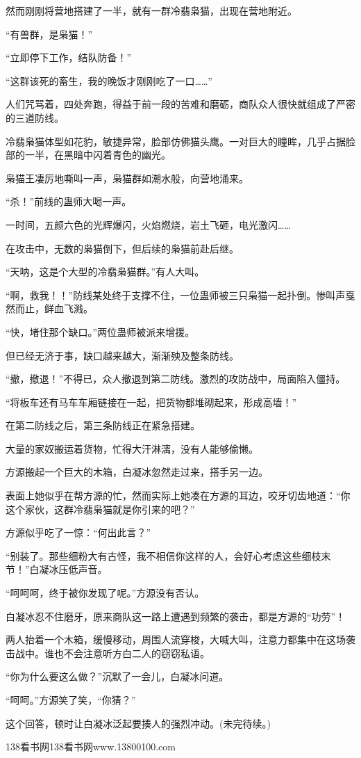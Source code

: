 \begin{this_body}
然而刚刚将营地搭建了一半，就有一群冷翡枭猫，出现在营地附近。

“有兽群，是枭猫！”

“立即停下工作，结队防备！”

“这群该死的畜生，我的晚饭才刚刚吃了一口……”

人们咒骂着，四处奔跑，得益于前一段的苦难和磨砺，商队众人很快就组成了严密的三道防线。

冷翡枭猫体型如花豹，敏捷异常，脸部仿佛猫头鹰。一对巨大的瞳眸，几乎占据脸部的一半，在黑暗中闪着青色的幽光。

枭猫王凄厉地嘶叫一声，枭猫群如潮水般，向营地涌来。

“杀！”前线的蛊师大喝一声。

一时间，五颜六色的光辉爆闪，火焰燃烧，岩土飞砸，电光激闪……

在攻击中，无数的枭猫倒下，但后续的枭猫前赴后继。

“天呐，这是个大型的冷翡枭猫群。”有人大叫。

“啊，救我！！”防线某处终于支撑不住，一位蛊师被三只枭猫一起扑倒。惨叫声戛然而止，鲜血飞溅。

“快，堵住那个缺口。”两位蛊师被派来增援。

但已经无济于事，缺口越来越大，渐渐殃及整条防线。

“撤，撤退！”不得已，众人撤退到第二防线。激烈的攻防战中，局面陷入僵持。

“将板车还有马车车厢链接在一起，把货物都堆砌起来，形成高墙！”

在第二防线之后，第三条防线正在紧急搭建。

大量的家奴搬运着货物，忙得大汗淋漓，没有人能够偷懒。

方源搬起一个巨大的木箱，白凝冰忽然走过来，搭手另一边。

表面上她似乎在帮方源的忙，然而实际上她凑在方源的耳边，咬牙切齿地道：“你这个家伙，这群冷翡枭猫就是你引来的吧？”

方源似乎吃了一惊：“何出此言？”

“别装了。那些细粉大有古怪，我不相信你这样的人，会好心考虑这些细枝末节！”白凝冰压低声音。

“呵呵呵，终于被你发现了呢。”方源没有否认。

白凝冰忍不住磨牙，原来商队这一路上遭遇到频繁的袭击，都是方源的“功劳”！

两人抬着一个木箱，缓慢移动，周围人流穿梭，大喊大叫，注意力都集中在这场袭击战中。谁也不会注意听方白二人的窃窃私语。

“你为什么要这么做？”沉默了一会儿，白凝冰问道。

“呵呵。”方源笑了笑，“你猜？”

这个回答，顿时让白凝冰泛起要揍人的强烈冲动。(未完待续。)

138看书网138看书网www.13800100.com

\end{this_body}

